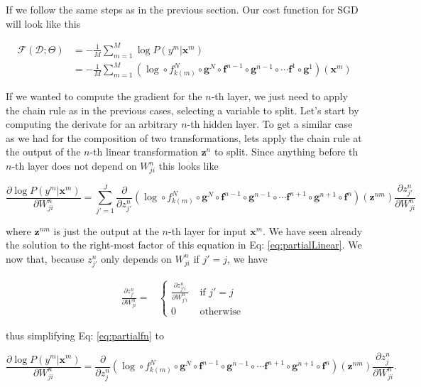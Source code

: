 If we follow the same steps as in the previous section. Our cost function for
SGD will look like this

\begin{align}
\mathcal{F}(\mathcal{D};\Theta) & = -\frac{1}{M}\sum_{m=1}^M \log P(y^m | \mathbf{x}^m)\nonumber\\ & = -\frac{1}{M}\sum_{m=1}^M (\log \circ f_{k(m)}^N \circ \mathbf{g}^N \circ \mathbf{f}^{n-1} \circ \mathbf{g}^{n-1} \circ \cdots \mathbf{f}^1 \circ \mathbf{g}^1)(\mathbf{x}^m)
\end{align}

If we wanted to compute the gradient for the $n$-th layer, we just need to
apply the chain rule as in the previous cases, selecting a variable to split.
Let's start by computing the derivate for an arbitrary $n$-th hidden layer. To
get a similar case as we had for the composition of two transformations, lets
apply the chain rule at the output of the $n$-th linear transformation
$\mathbf{z}^n$ to split. Since anything before th $n$-th layer does not depend
on $W_{ji}^n$ this looks like  

\begin{equation}
\frac{\partial \log P(y^m | \mathbf{x}^m)}{\partial W_{ji}^n} = \sum_{j'=1}^J \frac{\partial}{\partial z^n_{j'}} (\log \circ f_{k(m)}^N \circ \mathbf{g}^N \circ \mathbf{f}^{n-1} \circ \mathbf{g}^{n-1} \circ \cdots \mathbf{f}^{n+1} \circ \mathbf{g}^{n+1} \circ \mathbf{f}^{n})(\mathbf{z}^{nm})\frac{\partial z^n_{j'}}{\partial W_{ji}^n}
\label{eq:partialfn}
\end{equation}

where $\mathbf{z}^{nm}$ is just the output at the $n$-th layer for input
$\mathbf{x}^{m}$. We have seen already the solution to the right-most factor of
this equation in Eq: \ref{eq:partialLinear}. We now that, because $z^n_{j'}$
only depends on $W_{ji}^n$ if $j'=j$, we have 

\begin{align}
\frac{\partial z^n_{j'}}{\partial W_{ji}^n} =  
  &\begin{cases}
   \frac{\partial z^n_{j'i}}{\partial W_{j'i}^n}  &  \mbox{ if } j' = j\\ 
    0    &  \mbox{ otherwise } 
 \end{cases}
\end{align}

\noindent thus simplifying Eq: \ref{eq:partialfn} to

\begin{equation}
\frac{\partial \log P(y^m | \mathbf{x}^m)}{\partial W_{ji}^n} = \frac{\partial}{\partial z^n_{j}} (\log \circ f_{k(m)}^N \circ \mathbf{g}^N \circ \mathbf{f}^{n-1} \circ \mathbf{g}^{n-1} \circ \cdots \mathbf{f}^{n+1} \circ \mathbf{g}^{n+1} \circ \mathbf{f}^{n})(\mathbf{z}^{nm})\frac{\partial z^n_{j}}{\partial W_{ji}^n}.
\label{eq:partialfn2}
\end{equation}

